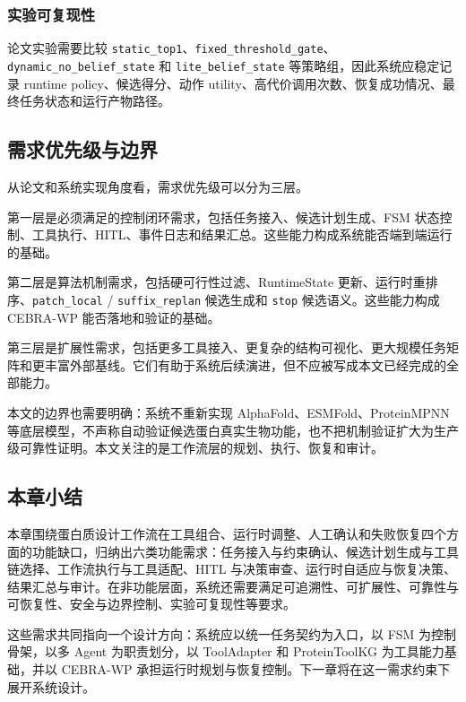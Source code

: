 \subsubsection{实验可复现性}\label{ux5b9eux9a8cux53efux590dux73b0ux6027}

论文实验需要比较
\texttt{static\_top1}、\texttt{fixed\_threshold\_gate}、\texttt{dynamic\_no\_belief\_state}
和 \texttt{lite\_belief\_state} 等策略组，因此系统应稳定记录 runtime
policy、候选得分、动作
utility、高代价调用次数、恢复成功情况、最终任务状态和运行产物路径。

\subsection{需求优先级与边界}\label{ux9700ux6c42ux4f18ux5148ux7ea7ux4e0eux8fb9ux754c}

从论文和系统实现角度看，需求优先级可以分为三层。

第一层是必须满足的控制闭环需求，包括任务接入、候选计划生成、FSM
状态控制、工具执行、HITL、事件日志和结果汇总。这些能力构成系统能否端到端运行的基础。

第二层是算法机制需求，包括硬可行性过滤、RuntimeState
更新、运行时重排序、\texttt{patch\_local} / \texttt{suffix\_replan}
候选生成和 \texttt{stop} 候选语义。这些能力构成 CEBRA-WP
能否落地和验证的基础。

第三层是扩展性需求，包括更多工具接入、更复杂的结构可视化、更大规模任务矩阵和更丰富外部基线。它们有助于系统后续演进，但不应被写成本文已经完成的全部能力。

本文的边界也需要明确：系统不重新实现 AlphaFold、ESMFold、ProteinMPNN
等底层模型，不声称自动验证候选蛋白真实生物功能，也不把机制验证扩大为生产级可靠性证明。本文关注的是工作流层的规划、执行、恢复和审计。

\subsection{本章小结}\label{requirements-analysis-summary}

本章围绕蛋白质设计工作流在工具组合、运行时调整、人工确认和失败恢复四个方面的功能缺口，归纳出六类功能需求：任务接入与约束确认、候选计划生成与工具链选择、工作流执行与工具适配、HITL
与决策审查、运行时自适应与恢复决策、结果汇总与审计。在非功能层面，系统还需要满足可追溯性、可扩展性、可靠性与可恢复性、安全与边界控制、实验可复现性等要求。

这些需求共同指向一个设计方向：系统应以统一任务契约为入口，以 FSM
为控制骨架，以多 Agent 为职责划分，以 ToolAdapter 和 ProteinToolKG
为工具能力基础，并以 CEBRA-WP
承担运行时规划与恢复控制。下一章将在这一需求约束下展开系统设计。
